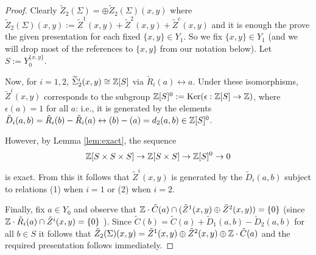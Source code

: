 \documentclass[12pt]{amsart}
\theoremstyle{definition}
\newcommand{\Z}{\Bbb{Z}}
\newcommand{\<}{\langle}
\renewcommand{\>}{\rangle}
\renewcommand{\ker}[1]{\mathrm{Ker}(#1)}
\begin{document}
\begin{proof}
Clearly $\tilde{Z}_2(\Sigma)=\oplus \tilde{Z}_2(\Sigma)(x,y)$ where $\tilde{Z}_2(\Sigma)(x,y):= \tilde{Z}^1(x,y)+\tilde{Z}^2(x,y)+\tilde{Z}^c(x,y)$ and it is enough the prove the given presentation for each fixed
 $\{x,y\}\in Y_1$.
So we fix $\{ x,y\}\in Y_1$ (and we will drop most of the references to $\{x,y\}$ from our notation below). Let $S:= Y^{\{ x,y\}}_0$.

Now, for $i=1,2$,  $\widetilde{\Sigma}_2^i(x,y)\cong \Z[S]$ via $\tilde{R}_i(a)\leftrightarrow a$.  
Under these isomorphisms, $\tilde{Z}^i(x,y)$  corresponds to the subgroup $\Z[S]^0:=\ker{\epsilon:\Z[S]\to \Z}$, where $\epsilon(a)=1$ for all $a$: i.e., it is generated by 
the elements  $\tilde{D}_i(a,b)=\tilde{R}_i(b)-\tilde{R}_i(a)\leftrightarrow (b)-(a)=d_2(a,b)\in \Z[S]^0$.

However,
by Lemma \ref{lem:exact}, the sequence
\[
\Z[S\times S\times S]\to \Z[S\times S]\to \Z[S]^0\to 0
\]
is exact. From this it follows that $\tilde{Z}^i(x,y)$ is generated by the $\tilde{D}_i(a,b)$ subject to relations (1) when $i=1$ or (2) when $i=2$.

Finally, fix $a\in Y_0$ and observe that $\Z\cdot \tilde{C}(a)\cap (\tilde{Z}^1(x,y)\oplus \tilde{Z}^2(x,y))=\{ 0\}$
 (since $\Z\cdot\tilde{R}_i(a)\cap \tilde{Z}^i(x,y)=\{ 0\}$ ).
Since $\tilde{C}(b)=\tilde{C}(a)+\tilde{D}_1(a,b)-\tilde{D}_2(a,b)$ for all $b\in S$ it follows that $\tilde{Z}_2(\Sigma)(x,y)=\tilde{Z}^1(x,y)\oplus \tilde{Z}^2(x,y)\oplus \Z\cdot \tilde{C}(a)$ and the required presentation follows immediately.
\end{proof}
\end{document}
